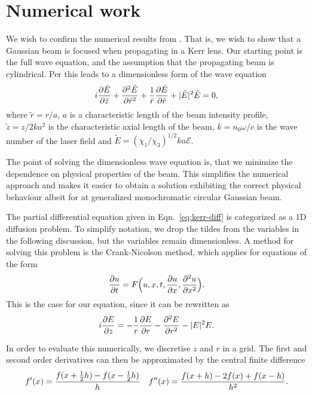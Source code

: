 \section{Numerical work}

We wish to confirm the numerical results from
\textcite{prl-selffocus}. That is, we wish to show that a Gaussian
beam is focused when propagating in a Kerr lens. Our starting point is
the full wave equation, and the assumption that the propagating beam
is cylindrical. Per \textcite{prl-selffocus} this leads to a
dimensionless form of the wave equation
\begin{align}
  \label{eq:kerr-diff}
   i \frac{\partial \tilde E}{\partial \tilde z} + \frac{\partial^2 \tilde E}{\partial \tilde r^2}
   + \frac{1}{\tilde r} \frac{\partial \tilde E}{\partial \tilde r}
   + |\tilde E|^2 \tilde E
   = 0,
\end{align}
where $\tilde r = r/a$, $a$ is a characteristic length of the beam
intensity profile, $\tilde z = z / 2ka^2$ is the characteristic axial
length of the beam, $k = n_0 \omega / c$ is the wave number of the
laser field and $\tilde E = (\chi_1/\chi_3)^{1/2} k a
\mathcal{E}$.

The point of solving the dimensionless wave equation is, that we
minimize the dependence on physical properties of the beam. This
simplifies the numerical approach and makes it easier to obtain a
solution exhibiting the correct physical behaviour albeit for at
generalized monochromatic circular Gaussian beam.

The partial differential equation given in Eqn.~\eqref{eq:kerr-diff}
is categorized as a 1D diffusion problem. To simplify notation, we
drop the tildes from the variables in the following discussion, but
the variables remain dimensionless. 
A method for solving this problem is
the Crank-Nicolson method, which applies for equations of the form
\begin{equation}
  \label{eq:Crank-Nicolson}
  \frac{\partial u}{\partial t} = F \Big(u, x, t, \frac{\partial u}{\partial x}, \frac{\partial^2 u}{\partial x^2} \Big). 
\end{equation}
This is the case for our equation, since it can be rewritten as
\begin{equation}
  \label{eq:kerr-diff-crank}
  i\frac{\partial E}{\partial z} = -\frac{1}{r} \frac{\partial E}{\partial r} - \frac{\partial^2 E}{\partial r^2} - |E|^{2} E. 
\end{equation}

In order to evaluate this numerically, we discretise $z$ and $r$ in a grid. The first
and second order derivatives can then be approximated by the central finite difference
\begin{equation}
  \label{eq:central-diff}
  f'(x) = \frac{f(x+\frac{1}{2} h) - f(x - \frac{1}{2} h)}{h} \quad f''(x) = \frac{f(x+h) - 2f(x) + f(x-h)}{h^{2}}.
\end{equation}

